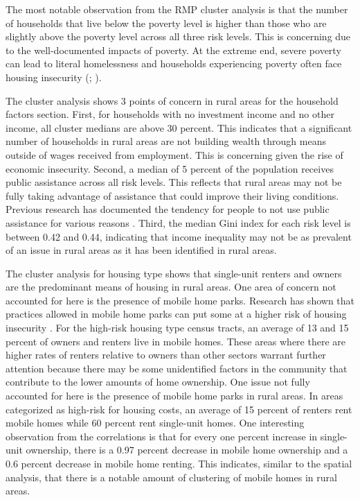 The most notable observation from the RMP cluster analysis is that the number of households that live below the poverty level is higher than those who are slightly above the poverty level across all three risk levels. This is concerning due to the well-documented impacts of poverty. At the extreme end, severe poverty can lead to literal homelessness and households experiencing poverty often face housing insecurity (\citealp{evans_reducing_2019}; \citealp{cox_road_2019}). 
 
 The cluster analysis shows 3 points of concern in rural areas for the household factors section. First, for households with no investment income and no other income, all cluster medians are above 30 percent. This indicates that a significant number of households in rural areas are not building wealth through means outside of wages received from employment. This is concerning given the rise of economic insecurity. Second, a median of 5 percent of the population receives public assistance across all risk levels. This reflects that rural areas may not be fully taking advantage of assistance that could improve their living conditions. Previous research has documented the tendency for people to not use public assistance for various reasons \citep{lichter_changing_2007}. Third, the median Gini index for each risk level is between 0.42 and 0.44, indicating that income inequality may not be as prevalent of an issue in rural areas as it has been identified in rural areas.

The cluster analysis for housing type shows that single-unit renters and owners are the predominant means of housing in rural areas. One area of concern not accounted for here is the presence of mobile home parks. Research has shown that practices allowed in mobile home parks can put some at a higher risk of housing insecurity \citep{mactavish_policy_2006}. For the high-risk housing type census tracts, an average of 13 and 15 percent of owners and renters live in mobile homes. These areas where there are higher rates of renters relative to owners than other sectors warrant further attention because there may be some unidentified factors in the community that contribute to the lower amounts of home ownership. One issue not fully accounted for here is the presence of mobile home parks in rural areas. In areas categorized as high-risk for housing costs, an average of 15 percent of renters rent mobile homes while 60 percent rent single-unit homes. One interesting observation from the correlations is that for every one percent increase in single-unit ownership, there is a 0.97 percent decrease in mobile home ownership and a 0.6 percent decrease in mobile home renting. This indicates, similar to the spatial analysis, that there is a notable amount of clustering of mobile homes in rural areas.  


